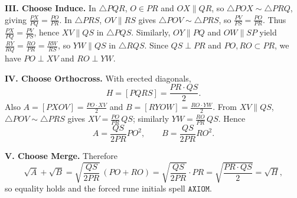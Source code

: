 \smallskip

\textbf{III. Choose \textbf{Induce}.} In \(\triangle PQR\), \(O\in PR\) and \(OX\parallel QR\), so \(\triangle POX\sim\triangle PRQ\), giving \(\frac{PX}{PQ}=\frac{PO}{PR}\).
In \(\triangle PRS\), \(OV\parallel RS\) gives \(\triangle POV\sim\triangle PRS\), so \(\frac{PV}{PS}=\frac{PO}{PR}\).
Thus \(\frac{PX}{PQ}=\frac{PV}{PS}\), hence \(XV\parallel QS\) in \(\triangle PQS\).
Similarly, \(OY\parallel PQ\) and \(OW\parallel SP\) yield \(\frac{RY}{RQ}=\frac{RO}{PR}=\frac{RW}{RS}\), so \(YW\parallel QS\) in \(\triangle RQS\).
Since \(QS\perp PR\) and \(PO,RO\subset PR\), we have \(PO\perp XV\) and \(RO\perp YW\).

\smallskip

\textbf{IV. Choose \textbf{Orthocross}.} With erected diagonals,
\[
H=[PQRS]=\frac{PR\cdot QS}{2}.
\]
Also \(A=[PXOV]=\frac{PO\cdot XV}{2}\) and \(B=[RYOW]=\frac{RO\cdot YW}{2}\).
From \(XV\parallel QS\), \(\triangle POV\sim\triangle PRS\) gives \(XV=\frac{PO}{PR}\,QS\); similarly \(YW=\frac{RO}{PR}\,QS\).
Hence
\[
A=\frac{QS}{2PR}PO^2,\qquad B=\frac{QS}{2PR}RO^2.
\]

\smallskip

\textbf{V. Choose \textbf{Merge}.} Therefore
\[
\sqrt{A}+\sqrt{B}=\sqrt{\frac{QS}{2PR}}\,(PO+RO)=\sqrt{\frac{QS}{2PR}}\cdot PR=\sqrt{\frac{PR\cdot QS}{2}}=\sqrt{H},
\]
so equality holds and the forced rune initials spell \(\boxed{\texttt{AXIOM}}\).


\NextPage